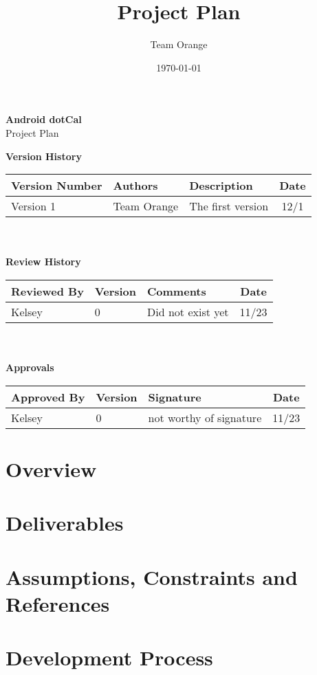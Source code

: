 \documentclass[11pt]{article}
\title{Project Plan}
\author{Team Orange}
\date{\today}
\begin{document}
\begin{centering}
\textbf{\huge{Android dotCal}}\\
\LARGE{Project Plan}

\end{centering}


\vspace{1cm}
\textbf{\large{Version History}}

\begin{tabular}{|l|l|l|c|}
\hline
Version Number & Authors & Description & Date\\
\hline
Version 1 & Team Orange & The first version & 12/1 \\
\hline
\end{tabular}\\\\

\textbf{\large{Review History}}

\begin{tabular}{|l|l|l|c|}
\hline
Reviewed By & Version & Comments & Date\\
\hline
Kelsey & 0 & Did not exist yet & 11/23 \\
\hline
\end{tabular}\\\\

\textbf{\large{Approvals}}

\begin{tabular}{|l|l|l|c|}
\hline
Approved By & Version & Signature & Date\\
\hline
Kelsey & 0 & not worthy of signature & 11/23 \\
\hline
\end{tabular}


\section{Overview}
\section{Deliverables}
\section{Assumptions, Constraints and References}
\section{Development Process}
\end{document}
